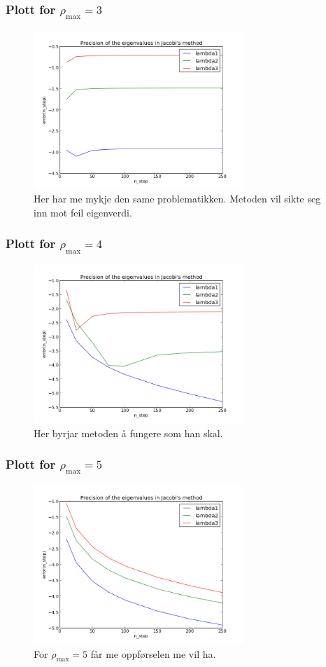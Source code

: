 \documentclass[11pt, a4paper]{article}
\begin{document}
    \subsubsection{Plott for $\rho_{\text{max}} = 3$}
      \begin{figure}[H]
        \centering
        \includegraphics[width=300px]{feil3.png}
        \caption{Her har me mykje den same problematikken. Metoden vil sikte seg inn mot feil eigenverdi.}
      \end{figure}

    \subsubsection{Plott for $\rho_{\text{max}} = 4$}
      \begin{figure}[H]
        \centering
        \includegraphics[width=300px]{feil4.png}
        \caption{Her byrjar metoden å fungere som han skal.}
      \end{figure}

    \subsubsection{Plott for $\rho_{\text{max}} = 5$}
      \begin{figure}[H]
        \centering
        \includegraphics[width=300px]{feil5.png}
        \caption{For $\rho_{\text{max}} = 5$ får me oppførselen me vil ha.}
      \end{figure}
\end{document}

